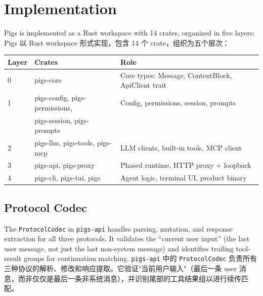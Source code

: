 \section{Implementation}
\label{sec:impl}

Pigs is implemented as a Rust workspace with 14 crates, organized in five layers:
Pigs 以 Rust workspace 形式实现，包含 14 个 crate，组织为五个层次：

\begin{center}
\begin{tabular}{lll}
\toprule
Layer & Crates & Role \\
\midrule
0 & pigs-core & Core types: Message, ContentBlock, ApiClient trait \\
1 & pigs-config, pigs-permissions, & Config, permissions, session, prompts \\
  & pigs-session, pigs-prompts & \\
2 & pigs-llm, pigs-tools, pigs-mcp & LLM clients, built-in tools, MCP client \\
3 & pigs-api, pigs-proxy & Phased runtime, HTTP proxy + loopback \\
4 & pigs-cli, pigs-tui, pigs & Agent logic, terminal UI, product binary \\
\bottomrule
\end{tabular}
\end{center}

\subsection{Protocol Codec}

The \texttt{ProtocolCodec} in \texttt{pigs-api} handles parsing, mutation, and response extraction for all three protocols. It validates the ``current user input'' (the last user message, not just the last non-system message) and identifies trailing tool-result groups for continuation matching.
\texttt{pigs-api} 中的 \texttt{ProtocolCodec} 负责所有三种协议的解析、修改和响应提取。它验证"当前用户输入"（最后一条 user 消息，而非仅仅是最后一条非系统消息），并识别尾部的工具结果组以进行续传匹配。

